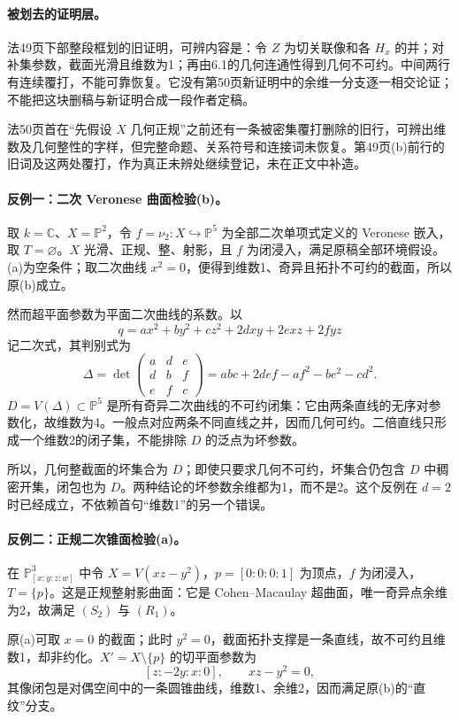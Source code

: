 \paragraph{被划去的证明层。}
法49页下部整段框划的旧证明，可辨内容是：令 $Z$ 为切关联像和各 $H_x$ 的并；对补集参数，截面光滑且维数为1；再由6.1的几何连通性得到几何不可约。中间两行有连续覆打，不能可靠恢复。它没有第50页新证明中的余维一分支逐一相交论证；不能把这块删稿与新证明合成一段作者定稿。

法50页首在“先假设 $X$ 几何正规”之前还有一条被密集覆打删除的旧行，可辨出维数及几何整性的字样，但完整命题、关系符号和连接词未恢复。第49页(b)前行的旧词及这两处覆打，作为真正未辨处继续登记，未在正文中补造。

\paragraph{反例一：二次 Veronese 曲面检验(b)。}
取 $k=\mathbb C$、$X=\mathbb P^2$，令 $f=\nu_2:X\hookrightarrow\mathbb P^5$ 为全部二次单项式定义的 Veronese 嵌入，取 $T=\varnothing$。$X$ 光滑、正规、整、射影，且 $f$ 为闭浸入，满足原稿全部环境假设。(a)为空条件；取二次曲线 $x^2=0$，便得到维数1、奇异且拓扑不可约的截面，所以原(b)成立。

然而超平面参数为平面二次曲线的系数。以
\[
 q=a x^2+b y^2+c z^2+2dxy+2exz+2fyz
\]
记二次式，其判别式为
\[
 \Delta=\det\begin{pmatrix}a&d&e\\d&b&f\\e&f&c\end{pmatrix}
 =abc+2def-af^2-be^2-cd^2.
\]
$D=V(\Delta)\subset\mathbb P^5$ 是所有奇异二次曲线的不可约闭集：它由两条直线的无序对参数化，故维数为4。一般点对应两条不同直线之并，因而几何可约。二倍直线只形成一个维数2的闭子集，不能排除 $D$ 的泛点为坏参数。

所以，几何整截面的坏集合为 $D$；即使只要求几何不可约，坏集合仍包含 $D$ 中稠密开集，闭包也为 $D$。两种结论的坏参数余维都为1，而不是2。这个反例在 $d=2$ 时已经成立，不依赖首句“维数1”的另一个错误。

\paragraph{反例二：正规二次锥面检验(a)。}
在 $\mathbb P^3_{[x:y:z:w]}$ 中令 $X=V(xz-y^2)$，$p=[0:0:0:1]$ 为顶点，$f$ 为闭浸入，$T=\{p\}$。这是正规整射影曲面：它是 Cohen--Macaulay 超曲面，唯一奇异点余维为2，故满足 $(S_2)$ 与 $(R_1)$。

原(a)可取 $x=0$ 的截面；此时 $y^2=0$，截面拓扑支撑是一条直线，故不可约且维数1，却非约化。$X'=X\setminus\{p\}$ 的切平面参数为
\[
 [z:-2y:x:0],\qquad xz-y^2=0,
\]
其像闭包是对偶空间中的一条圆锥曲线，维数1、余维2，因而满足原(b)的“直纹”分支。

